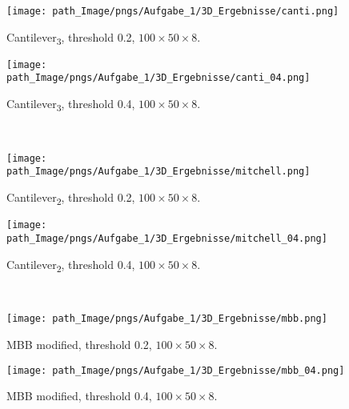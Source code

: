 \begin{figure}[!h]
\begin{minipage}{0.45\textwidth}
\centering
  \texttt{[image: path\_Image/pngs/Aufgabe\_1/3D\_Ergebnisse/canti.png]}
	\caption{Cantilever\textsubscript{3}, threshold 0.2, $100\times 50 \times 8$.}  
	\label{fig_load_canti_02}
\end{minipage}
\hfill
\begin{minipage}{0.45\textwidth}
\centering
  \texttt{[image: path\_Image/pngs/Aufgabe\_1/3D\_Ergebnisse/canti\_04.png]}
	\caption{Cantilever\textsubscript{3}, threshold 0.4, $100\times 50 \times 8$.} 
	\label{fig_load_canti_04}
\end{minipage}\\

\vspace{0.75cm}
\begin{minipage}{0.45\textwidth}
\centering
  \texttt{[image: path\_Image/pngs/Aufgabe\_1/3D\_Ergebnisse/mitchell.png]}
	\caption{Cantilever\textsubscript{2}, threshold 0.2, $100\times 50 \times 8$.} 
	\label{fig_load_mitchell_02}
\end{minipage}
\hfill
\begin{minipage}{0.45\textwidth}
\centering
  \texttt{[image: path\_Image/pngs/Aufgabe\_1/3D\_Ergebnisse/mitchell\_04.png]}
	\caption{Cantilever\textsubscript{2}, threshold 0.4, $100\times 50 \times 8$.} 
	\label{fig_load_mitchell_04}
\end{minipage}\\

\vspace{0.75cm}
\begin{minipage}{0.45\textwidth}
\centering
  \texttt{[image: path\_Image/pngs/Aufgabe\_1/3D\_Ergebnisse/mbb.png]}
	\caption{MBB modified, threshold 0.2, $100\times 50 \times 8$.} 
	\label{fig_load_mbb_02}
\end{minipage}
\hfill
\begin{minipage}{0.45\textwidth}
\centering
  \texttt{[image: path\_Image/pngs/Aufgabe\_1/3D\_Ergebnisse/mbb\_04.png]}
	\caption{MBB modified, threshold 0.4, $100\times 50 \times 8$.} 
	\label{fig_load_mbb_04}
\end{minipage}
\end{figure}

